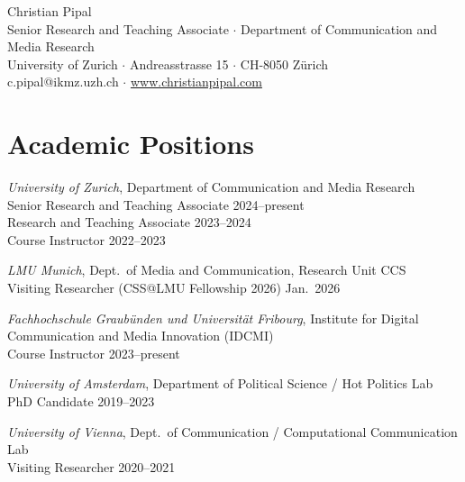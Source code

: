 \documentclass[11pt,a4paper]{article}
\begin{document}
\thispagestyle{empty}

\begin{center}
{\LARGE Christian Pipal}\\[6pt]
{\small Senior Research and Teaching Associate $\cdot$ Department of Communication and Media Research}\\
{\small University of Zurich $\cdot$ Andreasstrasse 15 $\cdot$ CH-8050 Z\"urich}\\[3pt]
{\small c.pipal@ikmz.uzh.ch $\cdot$ \href{https://www.christianpipal.com}{www.christianpipal.com}}
\end{center}

\vspace{12pt}

\section{Academic Positions}

\textit{University of Zurich}, Department of Communication and Media Research\\
\hspace*{1em}Senior Research and Teaching Associate \hfill 2024--present\\
\hspace*{1em}Research and Teaching Associate \hfill 2023--2024\\
\hspace*{1em}Course Instructor \hfill 2022--2023

\textit{LMU Munich}, Dept.\ of Media and Communication, Research Unit CCS\\
\hspace*{1em}Visiting Researcher (CSS@LMU Fellowship 2026) \hfill Jan.\ 2026

\textit{Fachhochschule Graubünden und Universität Fribourg}, Institute for Digital Communication and Media Innovation (IDCMI)\\
\hspace*{1em}Course Instructor \hfill 2023--present

\textit{University of Amsterdam}, Department of Political Science / Hot Politics Lab\\
\hspace*{1em}PhD Candidate \hfill 2019--2023

\textit{University of Vienna}, Dept.\ of Communication / Computational Communication Lab\\
\hspace*{1em}Visiting Researcher \hfill 2020--2021
\end{document}
